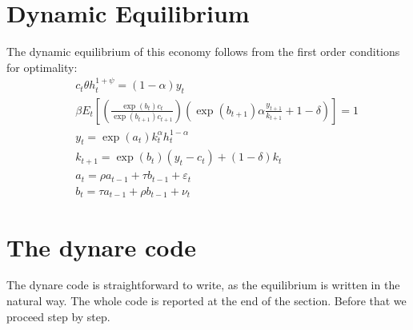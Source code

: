 \documentclass[11pt,a4paper]{article}
\begin{document}
 
\section{Dynamic Equilibrium}
The dynamic equilibrium of this economy follows from the first order conditions for optimality: 
\begin{eqnarray*}
&&c_t \theta h_t^{1+\psi}=(1-\alpha) y_t \\
&&\beta E_t\left[\left(\frac{\exp(b_t) c_t}{\exp(b_{t+1})c_{t+1}}\right)\left(\exp(b_{t+1})\alpha \frac{y_{t+1}}{k_{t+1}}+1-\delta\right)\right]=1\\
&&y_t=\exp(a_t) k_t^\alpha h_t^{1-\alpha} \\
&&k_{t+1}=\exp(b_t)(y_t-c_t)+(1-\delta)k_t \\
&&a_t=\rho a_{t-1}+\tau b_{t-1}+\varepsilon_t \\
&&b_t=\tau a_{t-1}+\rho b_{t-1}+\nu_t 
\end{eqnarray*}
\section{The {\sc dynare} code}
The {\sc dynare} code is straightforward to write, as the equilibrium is written in the natural way. The whole code is reported at the end of the section. Before that we proceed step by step.
\end{document}
